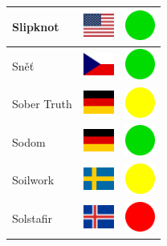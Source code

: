 \documentclass[12pt, a4paper, twoside]{report}
\begin{document}
\begin{center}
\begin{longtable}{|p{5cm}|p{2cm}|p{2cm}|}
 Slipknot                                                   & \includegraphics[width=1cm]{../img/flags/us} &   \includegraphics[width=1cm]{../likes/y} \\ \hline
 Sněť                                                       & \includegraphics[width=1cm]{../img/flags/cz} &   \includegraphics[width=1cm]{../likes/y} \\ \hline
 Sober Truth                                                & \includegraphics[width=1cm]{../img/flags/de} &   \includegraphics[width=1cm]{../likes/m} \\ \hline
 Sodom                                                      & \includegraphics[width=1cm]{../img/flags/de} &   \includegraphics[width=1cm]{../likes/y} \\ \hline
 Soilwork                                                   & \includegraphics[width=1cm]{../img/flags/se} &   \includegraphics[width=1cm]{../likes/m} \\ \hline
 Solstafir                                                  & \includegraphics[width=1cm]{../img/flags/is} &   \includegraphics[width=1cm]{../likes/n} \\ \hline

\end{longtable}
\end{center}
\end{document}
